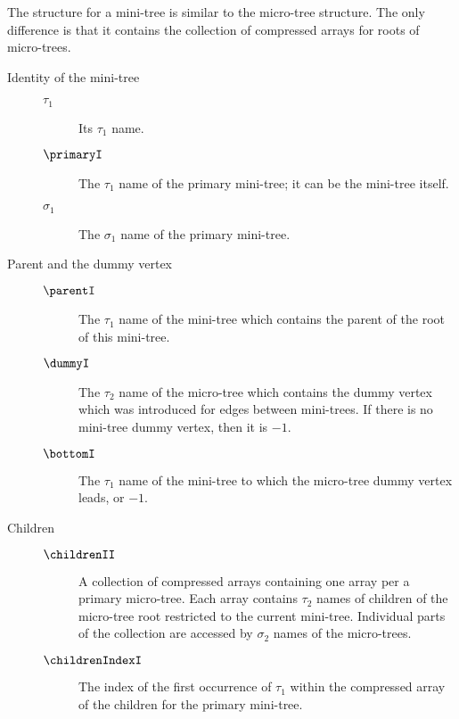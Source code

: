 The structure for a mini-tree is similar to the micro-tree structure.
The only difference is that it contains the collection of compressed arrays for roots of micro-trees.
\begin{description}
	\item[Identity of the mini-tree]
	\begin{description}
		\item[]
		
		\item[$\tau_1$]
		Its $\tau_1$ name.

		\item[$\primaryI$]
		The $\tau_1$ name of the primary mini-tree; it can be the mini-tree itself.
		
		\item[$\sigma_1$]
		The $\sigma_1$ name of the primary mini-tree.
	\end{description}

	\item[Parent and the dummy vertex]
	\begin{description}
		\item[]

		\item[$\parentI$]
		The $\tau_1$ name of the mini-tree which contains the parent of the root of this mini-tree.
		
		\item[$\dummyI$]
		The $\tau_2$ name of the micro-tree which contains the dummy vertex which was introduced for edges between mini-trees.
		If there is no mini-tree dummy vertex, then it is $-1$.
		
		\item[$\bottomI$]
		The $\tau_1$ name of the mini-tree to which the micro-tree dummy vertex leads, or $-1$.
	\end{description}
	
	\item[Children]
	\begin{description}
		\item[]

		\item[$\childrenII$]
		A collection of compressed arrays containing one array per a primary micro-tree.
		Each array contains $\tau_2$ names of children of the micro-tree root restricted to the current mini-tree.
		Individual parts of the collection are accessed by $\sigma_2$ names of the micro-trees.
		
		\item[$\childrenIndexI$]
		The index of the first occurrence of $\tau_1$ within the compressed array of the children for the primary mini-tree.
		

\end{description}
\end{description}
